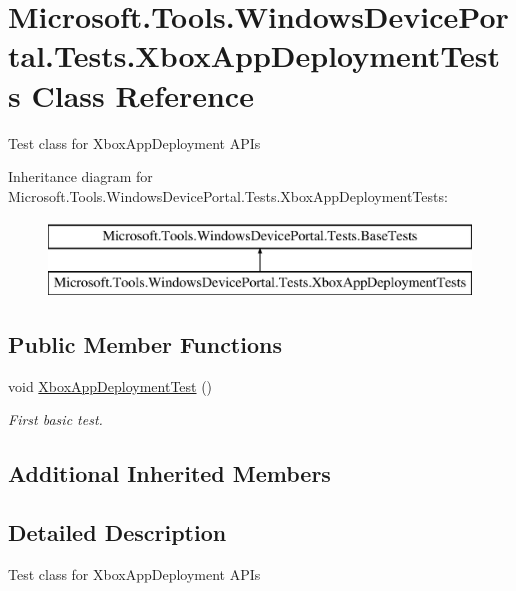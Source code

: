 \hypertarget{class_microsoft_1_1_tools_1_1_windows_device_portal_1_1_tests_1_1_xbox_app_deployment_tests}{}\section{Microsoft.\+Tools.\+Windows\+Device\+Portal.\+Tests.\+Xbox\+App\+Deployment\+Tests Class Reference}
\label{class_microsoft_1_1_tools_1_1_windows_device_portal_1_1_tests_1_1_xbox_app_deployment_tests}


Test class for Xbox\+App\+Deployment A\+P\+Is  


Inheritance diagram for Microsoft.\+Tools.\+Windows\+Device\+Portal.\+Tests.\+Xbox\+App\+Deployment\+Tests\+:\begin{figure}[H]
\begin{center}
\leavevmode
\includegraphics[height=2.000000cm]{class_microsoft_1_1_tools_1_1_windows_device_portal_1_1_tests_1_1_xbox_app_deployment_tests}
\end{center}
\end{figure}
\subsection*{Public Member Functions}
\begin{DoxyCompactItemize}
\item 
void \hyperlink{class_microsoft_1_1_tools_1_1_windows_device_portal_1_1_tests_1_1_xbox_app_deployment_tests_a15fd1e0cdd996d00d196a7db2073674a}{Xbox\+App\+Deployment\+Test} ()
\begin{DoxyCompactList}\small\item\em First basic test. \end{DoxyCompactList}\end{DoxyCompactItemize}
\subsection*{Additional Inherited Members}


\subsection{Detailed Description}
Test class for Xbox\+App\+Deployment A\+P\+Is 



